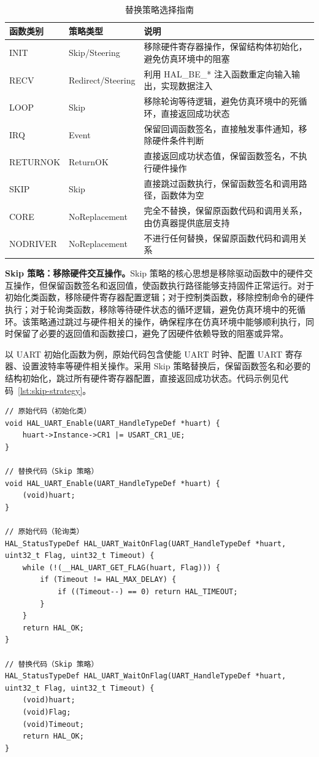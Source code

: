 \begin{table}[!htbp]
\centering
\caption{替换策略选择指南}
\label{tab:replace-strategies}
\small
\setlength{\tabcolsep}{4pt}
\begin{tabular}{@{}llp{5.9cm}@{}}
\toprule
\textbf{函数类别} & \textbf{策略类型} & \textbf{说明} \\
\midrule
INIT & Skip/Steering & 移除硬件寄存器操作，保留结构体初始化，避免仿真环境中的阻塞 \\
RECV & Redirect/Steering & 利用 HAL\_BE\_* 注入函数重定向输入输出，实现数据注入 \\
LOOP & Skip & 移除轮询等待逻辑，避免仿真环境中的死循环，直接返回成功状态 \\
IRQ & Event & 保留回调函数签名，直接触发事件通知，移除硬件条件判断 \\
RETURNOK & ReturnOK & 直接返回成功状态值，保留函数签名，不执行硬件操作 \\
SKIP & Skip & 直接跳过函数执行，保留函数签名和调用路径，函数体为空 \\
\midrule
CORE & NoReplacement & 完全不替换，保留原函数代码和调用关系，由仿真器提供底层支持 \\
NODRIVER & NoReplacement & 不进行任何替换，保留原函数代码和调用关系 \\
\bottomrule
\end{tabular}
\end{table}

\textbf{Skip 策略：移除硬件交互操作。}Skip 策略的核心思想是移除驱动函数中的硬件交互操作，但保留函数签名和返回值，使函数执行路径能够支持固件正常运行。对于初始化类函数，移除硬件寄存器配置逻辑；对于控制类函数，移除控制命令的硬件执行；对于轮询类函数，移除等待硬件状态的循环逻辑，避免仿真环境中的死循环。该策略通过跳过与硬件相关的操作，确保程序在仿真环境中能够顺利执行，同时保留了必要的返回值和函数接口，避免了因硬件依赖导致的阻塞或异常。

以 UART 初始化函数为例，原始代码包含使能 UART 时钟、配置 UART 寄存器、设置波特率等硬件相关操作。采用 Skip 策略替换后，保留函数签名和必要的结构初始化，跳过所有硬件寄存器配置，直接返回成功状态。代码示例见代码~\ref{lst:skip-strategy}。
\begin{lstlisting}[style=CStyle,abovecaptionskip=0pt,belowcaptionskip=0pt,caption=Skip 策略替换示例（初始化类和轮询类）,label=lst:skip-strategy]
// 原始代码（初始化类）
void HAL_UART_Enable(UART_HandleTypeDef *huart) {
    huart->Instance->CR1 |= USART_CR1_UE;
}

// 替换代码（Skip 策略）
void HAL_UART_Enable(UART_HandleTypeDef *huart) {
    (void)huart;
}

// 原始代码（轮询类）
HAL_StatusTypeDef HAL_UART_WaitOnFlag(UART_HandleTypeDef *huart, uint32_t Flag, uint32_t Timeout) {
    while (!(__HAL_UART_GET_FLAG(huart, Flag))) {
        if (Timeout != HAL_MAX_DELAY) {
            if ((Timeout--) == 0) return HAL_TIMEOUT;
        }
    }
    return HAL_OK;
}

// 替换代码（Skip 策略）
HAL_StatusTypeDef HAL_UART_WaitOnFlag(UART_HandleTypeDef *huart, uint32_t Flag, uint32_t Timeout) {
    (void)huart;
    (void)Flag;
    (void)Timeout;
    return HAL_OK;
}
\end{lstlisting}

